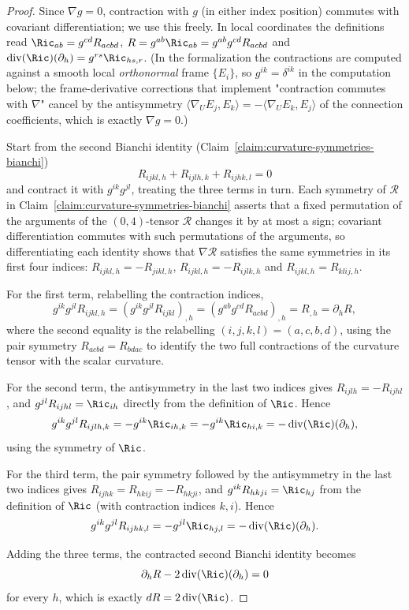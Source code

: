 \begin{proof}
\leanok
{}
Since $\nabla g=0$, contraction with $g$ (in either index position)
commutes with covariant differentiation; we use this freely. In
local coordinates the definitions read
$\Ric_{ab}=g^{cd}R_{acbd}$, $R=g^{ab}\Ric_{ab}=g^{ab}g^{cd}R_{acbd}$
and $\operatorname{div}(\Ric)(\partial_h)=g^{rs}\Ric_{hs,r}$.
(In the formalization the contractions are computed against a smooth
local {\em orthonormal} frame $\{E_i\}$, so $g^{ik}=\delta^{ik}$ in the
computation below; the frame-derivative corrections that implement
"contraction commutes with $\nabla$" cancel by the antisymmetry
$\langle\nabla_U E_j,E_k\rangle=-\langle\nabla_U E_k,E_j\rangle$ of the
connection coefficients, which is exactly $\nabla g=0$.)

Start from the second Bianchi identity
(Claim~\ref{claim:curvature-symmetries-bianchi})
$$R_{ijkl,h}+R_{ijlh,k}+R_{ijhk,l}=0$$
and contract it with $g^{ik}g^{jl}$, treating the three terms in
turn. Each symmetry of ${\mathcal R}$ in
Claim~\ref{claim:curvature-symmetries-bianchi} asserts that a fixed
permutation of the arguments of the $(0,4)$-tensor ${\mathcal R}$
changes it by at most a sign; covariant differentiation commutes
with such permutations of the arguments, so differentiating each
identity shows that $\nabla{\mathcal R}$ satisfies the same
symmetries in its first four indices:
$R_{ijkl,h}=-R_{jikl,h}$, $R_{ijkl,h}=-R_{ijlk,h}$ and
$R_{ijkl,h}=R_{klij,h}$.

For the first term, relabelling the contraction indices,
$$g^{ik}g^{jl}R_{ijkl,h}=\left(g^{ik}g^{jl}R_{ijkl}\right)_{,h}
=\left(g^{ab}g^{cd}R_{acbd}\right)_{,h}=R_{,h}=\partial_hR,$$
where the second equality is the relabelling
$(i,j,k,l)=(a,c,b,d)$, using the pair symmetry
$R_{acbd}=R_{bdac}$ to identify the two full contractions of the
curvature tensor with the scalar curvature.

For the second term, the antisymmetry in the last two indices gives
$R_{ijlh}=-R_{ijhl}$, and $g^{jl}R_{ijhl}=\Ric_{ih}$ directly from
the definition of $\Ric$. Hence
$$g^{ik}g^{jl}R_{ijlh,k}=-g^{ik}\Ric_{ih,k}
=-g^{ik}\Ric_{hi,k}=-\operatorname{div}(\Ric)(\partial_h),$$
using the symmetry of $\Ric$.

For the third term, the pair symmetry followed by the antisymmetry
in the last two indices gives $R_{ijhk}=R_{hkij}=-R_{hkji}$, and
$g^{ik}R_{hkji}=\Ric_{hj}$ from the definition of $\Ric$ (with
contraction indices $k,i$). Hence
$$g^{ik}g^{jl}R_{ijhk,l}=-g^{jl}\Ric_{hj,l}
=-\operatorname{div}(\Ric)(\partial_h).$$

Adding the three terms, the contracted second Bianchi identity
becomes
$$\partial_hR-2\operatorname{div}(\Ric)(\partial_h)=0$$
for every $h$, which is exactly $dR=2\operatorname{div}(\Ric)$.
\end{proof}


